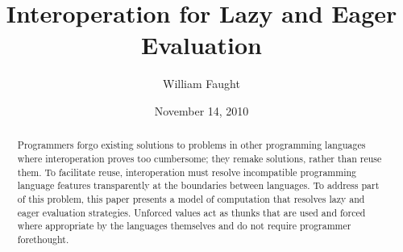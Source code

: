 \documentclass[12pt]{article}
\begin{document}
\title{Interoperation for Lazy and Eager Evaluation}
\author{William Faught}
\date{November 14, 2010}
\maketitle

\begin{abstract}
Programmers forgo existing solutions to problems in other programming languages where interoperation proves too cumbersome; they remake solutions, rather than reuse them. To facilitate reuse, interoperation must resolve incompatible programming language features transparently at the boundaries between languages. To address part of this problem, this paper presents a model of computation that resolves lazy and eager evaluation strategies. Unforced values act as thunks that are used and forced where appropriate by the languages themselves and do not require programmer forethought.
\end{abstract}







\clearpage

\nocite{*}


\end{document}
